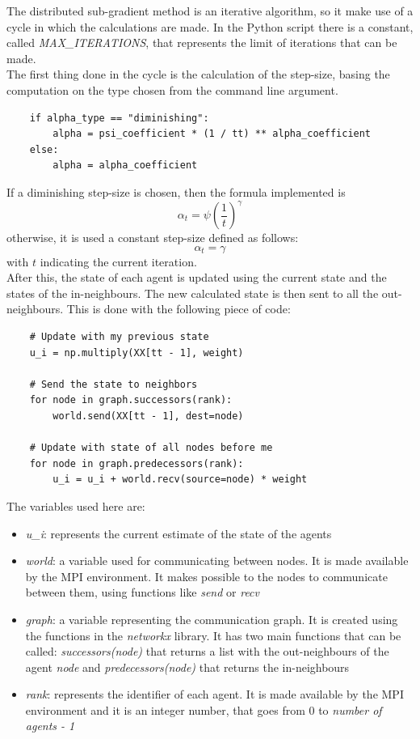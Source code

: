 \documentclass[a4paper,11pt,oneside]{book}
\begin{document}
The distributed sub-gradient method is an iterative algorithm, so it make use of a cycle in which the calculations are made. In the Python script there is a constant, called \textit{MAX\_ITERATIONS}, that represents the limit of iterations that can be made. \\
The first thing done in the cycle is the calculation of the step-size, basing the computation on the type chosen from the command line argument.

\begin{lstlisting}
    if alpha_type == "diminishing":
        alpha = psi_coefficient * (1 / tt) ** alpha_coefficient
    else:
        alpha = alpha_coefficient
\end{lstlisting}
If a diminishing step-size is chosen, then the formula implemented is
\begin{equation}
	\alpha_t = \psi \left( \dfrac{1}{t} \right)^\gamma
\end{equation}
otherwise, it is used a constant step-size defined as follows:
\begin{equation}
	\alpha_t = \gamma
\end{equation}
with $t$ indicating the current iteration. \\

After this, the state of each agent is updated using the current state and the states of the in-neighbours. The new calculated state is then sent to all the out-neighbours. This is done with the following piece of code:
\begin{lstlisting}
    # Update with my previous state
    u_i = np.multiply(XX[tt - 1], weight)

    # Send the state to neighbors
    for node in graph.successors(rank):
        world.send(XX[tt - 1], dest=node)

    # Update with state of all nodes before me
    for node in graph.predecessors(rank):
        u_i = u_i + world.recv(source=node) * weight
\end{lstlisting}

The variables used here are:
\begin{itemize}
	\item  \textit{u\_i}: represents the current estimate of the state of the agents
	\item \textit{world}: a variable used for communicating between nodes. It is made available by the MPI environment. It makes possible to the nodes to communicate between them, using functions like \textit{send} or \textit{recv}
	\item \textit{graph}: a variable representing the communication graph. It is created using the functions in the \textit{networkx} library. It has two main functions that can be called: \textit{successors(node)} that returns a list with the out-neighbours of the agent \textit{node} and \textit{predecessors(node)} that returns the in-neighbours
	\item \textit{rank}: represents the identifier of each agent. It is made available by the MPI environment and it is an integer number, that goes from $0$ to \textit{number of agents - 1}
\end{itemize}
\end{document}
